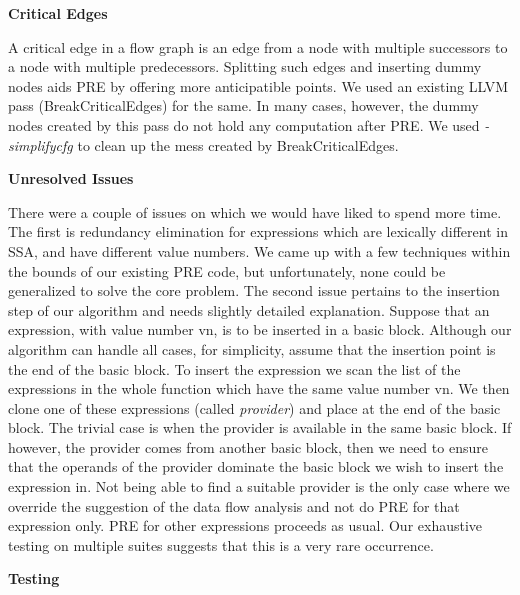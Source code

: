 \documentclass[10pt,twoside]{report}
\begin{document}
\begin{flushleft}
\textbf{\large{Critical Edges}}
\end{flushleft}

A critical edge in a flow graph is an edge from a node with multiple successors to a node with multiple predecessors. Splitting such edges and inserting dummy nodes aids PRE by offering more anticipatible points. We used an existing LLVM pass (BreakCriticalEdges) for the same. In many cases, however, the dummy nodes created by this pass do not hold any computation after PRE. We used \emph{-simplifycfg} to clean up the mess created by BreakCriticalEdges.


\begin{flushleft}
\textbf{\large{Unresolved Issues}}
\end{flushleft}
There were a couple of issues on which we would have liked to spend more time.
The first is redundancy elimination for expressions which are lexically
different in SSA, and have different value numbers. We came up with a few
techniques within the bounds of our existing PRE code, but unfortunately, none
could be generalized to solve the core problem. The second issue pertains to
the insertion step of our algorithm and needs slightly detailed explanation.
Suppose that an expression, with value number vn, is to be inserted in a basic
block. Although our algorithm can handle all cases, for simplicity, assume that
the insertion point is the end of the basic block. To insert the expression we
scan the list of the expressions in the whole function which have the same
value number vn.  We then clone one of these expressions (called
    \emph{provider}) and place at the end of the basic block. The trivial case
is when the provider is available in the same basic block. If however, the
provider comes from another basic block, then we need to ensure that the
operands of the provider dominate the basic block we wish to insert the
expression in. Not being able to find a suitable provider is the only case
where we override the suggestion of the data flow analysis and not do PRE for
that expression only. PRE for other expressions proceeds as usual. Our
exhaustive testing on multiple suites suggests that this is a very rare
occurrence. 

\newpage  
\begin{flushleft}
\textbf{\Large{Testing}}
\end{flushleft}
\end{document}
